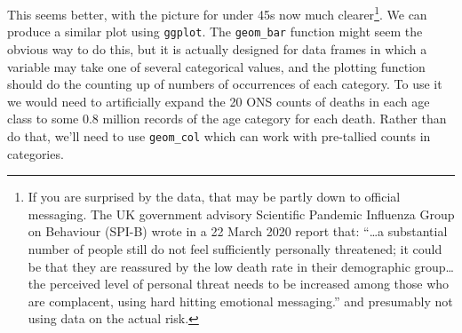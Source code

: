 \documentclass[10pt] {article}
\theoremstyle{definition}
\begin{document}
This seems better, with the picture for under 45s now much clearer\footnote{If you are surprised by the data, that may be partly down to official messaging. The UK government advisory Scientific Pandemic Influenza Group on Behaviour (SPI-B) wrote in a 22 March 2020 report that: ``\ldots a substantial number of people still do not feel sufficiently personally threatened; it could be that they are reassured by the low death rate in their demographic group\ldots the perceived level of personal threat needs to be increased among those who are complacent, using hard hitting emotional messaging.'' and presumably not using data on the actual risk. }. We can produce a similar plot using {\tt ggplot}. The \lstinline+geom_bar+ function might seem the obvious way to do this, but it is actually designed for data frames in which a variable may take one of several categorical values, and the plotting function should do the counting up of numbers of occurrences of each category. To use it we would need to artificially expand the 20 ONS counts of deaths in each age class to some 0.8 million records of the age category for each death. Rather than do that, we'll need to use \lstinline+geom_col+ which can work with pre-tallied counts in categories.  
 
\end{document}
